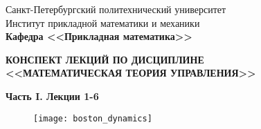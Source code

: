 \documentclass[main.tex]{subfiles}
\begin{document}
\begin{titlepage}
\begin{center}
	\begin{large}
		Санкт-Петербургский политехнический университет\\
		Институт прикладной математики и механики\\
		\textbf{Кафедра <<Прикладная математика>>}\\
	\end{large}
	\vfill
	\Large{\textbf{КОНСПЕКТ ЛЕКЦИЙ ПО ДИСЦИПЛИНЕ \\
			 <<МАТЕМАТИЧЕСКАЯ ТЕОРИЯ УПРАВЛЕНИЯ>>}}

           \textbf{ Часть I. Лекции 1-6 }
\end{center}
\vfill
\begin{figure}[H]
	\centering \texttt{[image: boston\_dynamics]}
\end{figure}
\vfill
{}
\end{titlepage}
\end{document}

